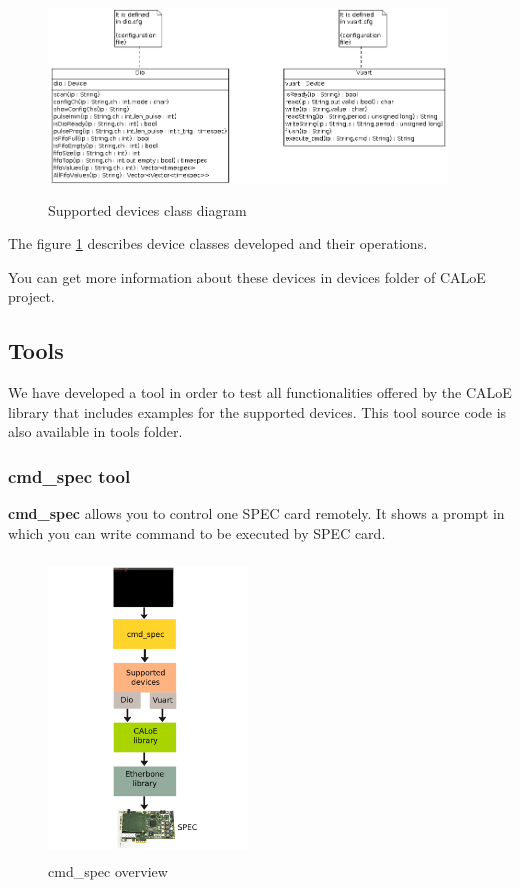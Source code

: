 \begin{figure}[H]
\centering
\includegraphics[width=400px,height=200px]{img/caloe_devices.png}
\caption{Supported devices class diagram}
\label{supported_dev_cd_img}
\end{figure}

The figure \ref{supported_dev_cd_img} describes device classes developed and their operations.

You can get more information about these devices in devices folder of CALoE project.

\subsection{Tools}

We have developed a tool in order to test all functionalities offered by the CALoE library that includes examples for the supported devices. This tool source code is also available in tools folder.

\subsubsection{cmd\_spec tool}

\textbf{cmd\_spec} allows you to control one SPEC card remotely. It shows a prompt in which you can write command to be executed by SPEC card.

\begin{figure}[H]
\centering
\includegraphics[width=200px,height=300px]{img/cmd_spec.png}
\caption{cmd\_spec overview}
\label{cmd_spec_overview_img}
\end{figure}

